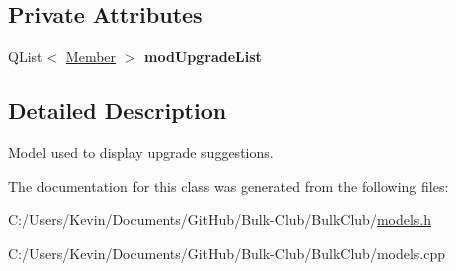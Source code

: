 \subsection*{Private Attributes}
\begin{DoxyCompactItemize}
\item 
\mbox{\label{class_upgrade_model_a30677388a974e8420c3c3048f0c9d8c0}} 
Q\+List$<$ \mbox{\hyperlink{class_member}{Member}} $>$ {\bfseries mod\+Upgrade\+List}
\end{DoxyCompactItemize}


\subsection{Detailed Description}
Model used to display upgrade suggestions. 

The documentation for this class was generated from the following files\+:\begin{DoxyCompactItemize}
\item 
C\+:/\+Users/\+Kevin/\+Documents/\+Git\+Hub/\+Bulk-\/\+Club/\+Bulk\+Club/\mbox{\hyperlink{models_8h}{models.\+h}}\item 
C\+:/\+Users/\+Kevin/\+Documents/\+Git\+Hub/\+Bulk-\/\+Club/\+Bulk\+Club/models.\+cpp\end{DoxyCompactItemize}
